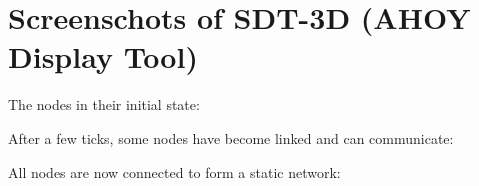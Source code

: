 \documentclass{article}
\begin{document}
\section{Screenschots of SDT-3D (AHOY Display Tool)}
The nodes in their initial state:

After a few ticks, some nodes have become linked and can communicate:

All nodes are now connected to form a static network:
\end{document}
